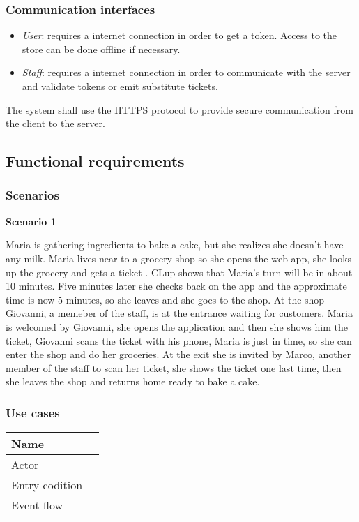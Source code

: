 \subsubsection{Communication interfaces}
\begin{itemize}
    \item \emph{User}: requires a internet connection in order to get a token. Access to the store can be done offline if necessary.
    \item \emph{Staff}: requires a internet connection in order to communicate with the server and validate tokens or emit substitute tickets.
\end{itemize}
The system shall use the HTTPS protocol to provide secure communication from the client to the server.
\subsection{Functional requirements}
\subsubsection{Scenarios}
\textbf{Scenario 1}

Maria is gathering ingredients to bake a cake, but she realizes she doesn't have any milk.
Maria lives near to a grocery shop so she opens the web app, she looks up the grocery and gets a ticket .
CLup shows that Maria's turn will be in about 10 minutes. Five minutes later she checks back on the app and the approximate time is now 5 minutes, so she leaves and she goes to the shop.
At the shop Giovanni, a memeber of the staff, is at the entrance waiting for customers. Maria is welcomed by Giovanni, she opens the application and  then she shows him the ticket, Giovanni scans the ticket with his phone, Maria is just in time, so she can enter the shop and do her groceries.
At the exit she is invited by Marco, another member of the staff to scan her ticket, she shows the ticket one last time, then she leaves the shop and returns home ready to bake a cake.

\subsubsection{Use cases}

\begin{table}[h]
    \begin{tabular}{|l|l|}
    \hline
    Name           & \todo{\#}    \\ \hline
    Actor          & \todo{\#} \\ \hline
    Entry codition & \todo{\#}   \\ \hline
    Event flow     & \todo{\#}    \\ \hline
    \end{tabular}
\end{table}

